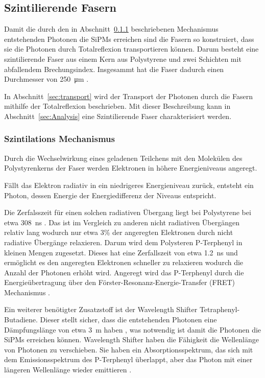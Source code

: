 \subsection{Szintilierende Fasern}
\label{sec:szintilierende_Fasern}
Damit die durch den in Abschnitt~\ref{sec:mechanismus} beschriebenen Mechanismus entstehenden Photonen die SiPMs erreichen sind die Fasern so konstruiert, 
dass sie die Photonen durch Totalreflexion transportieren können.
Darum besteht eine szintilierende Faser aus einem Kern aus Polystyrene und zwei Schichten mit abfallendem Brechungsindex.
Insgesammt hat die Faser dadurch einen Durchmesser von \SI{250}{\micro\meter} \cite{Anleitung}.

In Abschnitt~\ref{sec:transport} wird der Transport der Photonen durch die Fasern mithilfe der Totalreflexion beschrieben.
Mit dieser Beschreibung kann in Abschnitt~\ref{sec:Analysis} eine Szintilierende Faser charakterisiert werden.
\subsubsection{Szintilations Mechanismus}
\label{sec:mechanismus}
Durch die Wechselwirkung eines geladenen Teilchens mit den Molekülen des Polystyrenkerns der Faser werden Elektronen in höhere Energieniveaus angeregt.

Fällt das Elektron radiativ in ein niedrigeres Energieniveau zurück,
entsteht ein Photon, dessen Energie der Energiedifferenz der Niveaus entspricht.

Die Zerfalsszeit für einen solchen radiativen Übergang liegt bei Polystyrene bei etwa \SI{308}{\nano\second} .
Das ist im Vergleich zu anderen nicht radiativen Übergängen relativ lang wodurch nur etwa 3\% der angeregten Elektronen durch nicht radiative Übergänge relaxieren.
Darum wird dem Polysteren P-Terphenyl in kleinen Mengen zugesetzt.
Dieses hat eine Zerfallszeit von etwa \SI{1.2}{\nano\second} \cite{Anleitung} und ermöglicht es den angeregten Elektronen schneller zu relaxieren wodurch die Anzahl der Photonen erhöht wird.
Angeregt wird das P-Terphenyl durch die Energieübertragung über den Förster-Resonanz-Energie-Transfer (FRET) Mechanismus \cite{Anleitung}.

Ein weiterer benötigter Zusatzstoff ist der Wavelength Shifter Tetraphenyl-Butadiene.
Dieser stellt sicher,
dass die entstehenden Photonen eine Dämpfungslänge von etwa \SI{3}{\meter} haben \cite{Anleitung},
was notwendig ist damit die Photonen die SiPMs erreichen können.
Wavelength Shifter haben die Fähigkeit die Wellenlänge von Photonen zu verschieben.
Sie haben ein Absorptionsspektrum, das sich mit dem Emissionsspektrum des P-Terphenyl überlappt,
aber das Photon mit einer längeren Wellenlänge wieder emittieren \cite{Anleitung}.

